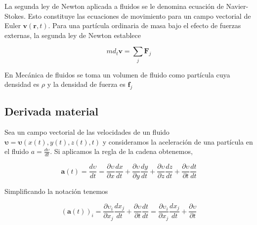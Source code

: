 \documentclass[12pt]{book}
\theoremstyle{definition}
\theoremstyle{remark}
\theoremstyle{plain}
\begin{document}
La segunda ley de Newton aplicada a fluidos se le denomina ecuación de Navier-Stokes. Esto
constituye las ecuaciones de movimiento para un campo vectorial de Euler $\mathbf{v}(\mathbf{r},t)$. Para una
partícula ordinaria de masa bajo el efecto de fuerzas externas, la segunda ley de Newton
establece

\begin{equation}
\label{equ200}
 m d_t \mathbf{v}= \sum_{j} \mathbf{F}_j
\end{equation}

En Mecánica de fluidos se toma un volumen de fluido como partícula cuya densidad es $\rho$ y la densidad de fuerza es $\mathbf{f}_j$

\subsection{Derivada material}

Sea un campo vectorial de las velocidades de un fluido $\mathbf{\upsilon}= \mathbf{\upsilon}(x(t), y(t), z(t), t )$ y consideramos 
la aceleración de una partícula en el fluido $a = \frac{d \upsilon}{d t}$. Si aplicamos la regla de la cadena obtenemos,

\begin{equation}
 \label{equ201}
\mathbf{a}(t) = \frac{d \upsilon}{d t} =  \frac{\partial \upsilon}{\partial x} \frac{d x}{d t} +  \frac{\partial \upsilon}{\partial y} \frac{d y}{d t} +  \frac{\partial \upsilon}{\partial z}\frac{d z}{d t}+\frac{\partial \upsilon}{\partial t}\frac{d t}{d t}
\end{equation} 

Simplificando la notación tenemos

\begin{equation}
 \label{equ202}
(\mathbf{a}(t))_i = \frac{\partial \upsilon_i}{\partial x_j} \frac{d x_j}{d t} + \frac{\partial \upsilon}{\partial t}\frac{d t}{d t}=\frac{\partial \upsilon_i}{\partial x_j} \frac{d x_j}{d t} + \frac{\partial \upsilon}{\partial t}
\end{equation} 





\backmatter
\end{document}
